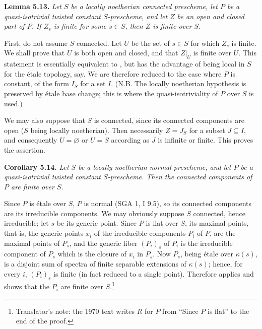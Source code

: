 \par\medskip\noindent
\textbf{Lemma 5.13.}\enspace
\emph{Let \(S\) be a locally noetherian connected prescheme, let \(P\) be
a quasi-isotrivial twisted constant \(S\)-prescheme, and let \(Z\) be an
open and closed part of \(P\). If \(Z_s\) is finite for some \(s\in S\),
then \(Z\) is finite over \(S\).}

First, do not assume \(S\) connected. Let \(U\) be the set of \(s\in S\)
for which \(Z_s\) is finite. We shall prove that \(U\) is both open and
closed, and that \(Z|_U\) is finite over \(U\). This statement is
essentially equivalent to , but has the advantage of being local in
\(S\) for the étale topology, say. We are therefore reduced to the case
where \(P\) is constant, of the form \(I_S\) for a set \(I\). (N.B. The
locally noetherian hypothesis is preserved by étale base change; this is
where the quasi-isotriviality of \(P\) over \(S\) is used.)

We may also suppose that \(S\) is connected, since its connected components
are open (\(S\) being locally noetherian). Then necessarily \(Z=J_S\) for
a subset \(J\subseteq I\), and consequently \(U=\varnothing\) or \(U=S\)
according as \(J\) is infinite or finite. This proves the assertion.

\par\medskip\noindent
\textbf{Corollary 5.14.}\enspace
\emph{Let \(S\) be a locally noetherian normal prescheme, and let \(P\) be a
quasi-isotrivial twisted constant \(S\)-prescheme. Then the connected
components of \(P\) are finite over \(S\).}

Since \(P\) is étale over \(S\), \(P\) is normal (SGA 1, I 9.5), so its
connected components are its irreducible components. We may obviously
suppose \(S\) connected, hence irreducible; let \(s\) be its generic point.
Since \(P\) is flat over \(S\), its maximal points, that is, the generic
points \(x_i\) of the irreducible components \(P_i\) of \(P\), are the
maximal points of \(P_s\), and the generic fiber \((P_i)_s\) of \(P_i\) is
the irreducible component of \(P_s\) which is the closure of \(x_i\) in
\(P_s\). Now \(P_s\), being étale over \(\kappa(s)\), is a disjoint sum of
spectra of finite separable extensions of \(\kappa(s)\); hence, for every
\(i\), \((P_i)_s\) is finite (in fact reduced to a single point). Therefore
 applies and shows that the \(P_i\) are finite over
\(S\).\footnote{Translator's note: the 1970 text writes \(R\) for \(P\) from
``Since \(P\) is flat'' to the end of the proof.}


